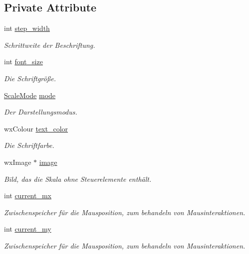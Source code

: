 \subsection*{Private Attribute}
\begin{DoxyCompactItemize}
\item 
int \hyperlink{classGUIColorScalePanel_a5f9789cc727854594c7d29c392578427}{step\-\_\-width}
\begin{DoxyCompactList}\small\item\em Schrittweite der Beschriftung. \end{DoxyCompactList}\item 
int \hyperlink{classGUIColorScalePanel_acd79c1dedc939040b03f54f21e78d72f}{font\-\_\-size}
\begin{DoxyCompactList}\small\item\em Die Schriftgröße. \end{DoxyCompactList}\item 
\hyperlink{classGUIColorScalePanel_a56a63e898188b90b82295ff7c3ebc265}{Scale\-Mode} \hyperlink{classGUIColorScalePanel_ad2f795e0d3a1c8e731da16d3320dbd34}{mode}
\begin{DoxyCompactList}\small\item\em Der Darstellungsmodus. \end{DoxyCompactList}\item 
wx\-Colour \hyperlink{classGUIColorScalePanel_a48e282e7a3bfff30894e9e6edfd120dc}{text\-\_\-color}
\begin{DoxyCompactList}\small\item\em Die Schriftfarbe. \end{DoxyCompactList}\item 
wx\-Image $\ast$ \hyperlink{classGUIColorScalePanel_ac398e4b12cea263a89db6dd236ec1e87}{image}
\begin{DoxyCompactList}\small\item\em Bild, das die Skala ohne Steuerelemente enthält. \end{DoxyCompactList}\item 
int \hyperlink{classGUIColorScalePanel_ab3da81e6c3cfb9122c0291584276a54d}{current\-\_\-mx}
\begin{DoxyCompactList}\small\item\em Zwischenspeicher für die Mausposition, zum behandeln von Mausinteraktionen. \end{DoxyCompactList}\item 
int \hyperlink{classGUIColorScalePanel_abb73679c805d8bcdd1ca0cb602887f84}{current\-\_\-my}
\begin{DoxyCompactList}\small\item\em Zwischenspeicher für die Mausposition, zum behandeln von Mausinteraktionen. \end{DoxyCompactList}\item 

\end{DoxyCompactItemize}
